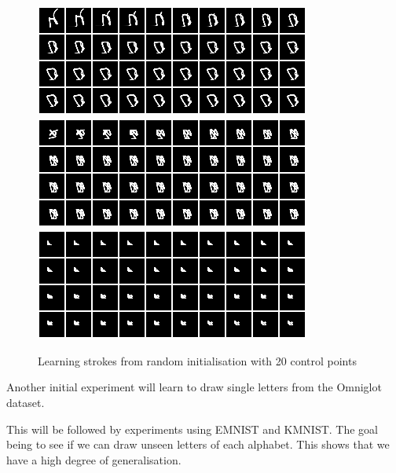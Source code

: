 \documentclass{article}
\begin{document}
\begin{figure}[htb!]
\includegraphics[scale=0.25]{../results/debug_recon/rand_init8_20.png}
\includegraphics[scale=0.25]{../results/debug_recon/rand_init9_20.png}
\includegraphics[scale=0.25]{../results/debug_recon/rand_init10_20.png}
\caption{Learning strokes from random initialisation with 20 control points}
\label{fig:shiftedinitrand20}
\end{figure}


Another initial experiment will learn to draw single letters from the Omniglot\citet{lake2015human} dataset.


This will be followed by experiments using EMNIST\citep{cohen1702emnist} and
KMNIST\citep{clanuwat2018deep}. The goal being to see if we can draw unseen letters of each
alphabet. This shows that we have a high degree of generalisation.









\end{document}
